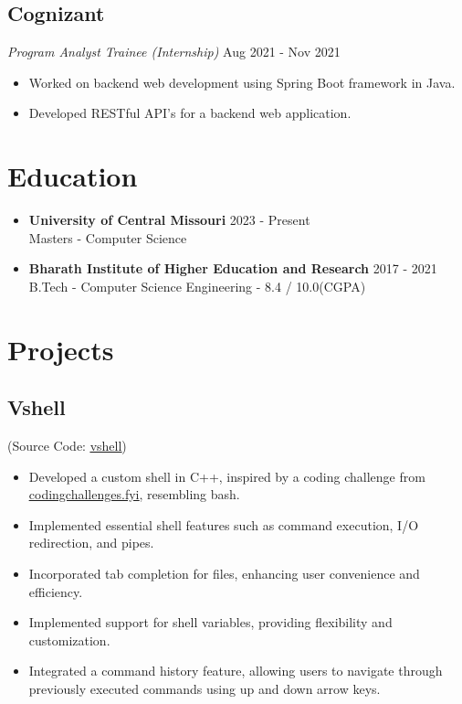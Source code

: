 \documentclass[10pt,a5paper]{article}
\begin{document}
\subsection{Cognizant}
\hspace*{0.25em}\textit{Program Analyst Trainee (Internship)}
\hfill Aug 2021 - Nov 2021
\begin{itemize}[leftmargin=6mm]
	\setlength\itemsep{0em}
	\item{Worked on backend web development using Spring Boot framework in Java.}
	\item{Developed RESTful API's for a backend web application.}
\end{itemize}

\section{Education}
\begin{itemize}[leftmargin=3mm]
	\setlength\itemsep{0em}
\item{
	\textbf{University of Central Missouri}
	\hfill 2023 {-} Present \\
	Masters {-} Computer Science
}
\item {
	\textbf{Bharath Institute of Higher Education and Research}
	\hfill 2017 {-} 2021 \\
	B.Tech {-} Computer Science Engineering {-} 8.4 / 10.0(CGPA)
}
\end{itemize}

\section{Projects}
\subsection{Vshell}
\hfill (Source Code: \href{https://github.com/v1n0dh/vshell}{\underline {vshell}})
\begin{itemize}[leftmargin=6mm]
	\setlength\itemsep{0em}
	\item{Developed a custom shell in C++, inspired by a coding challenge from \href{https://codingchallenges.fyi/challenges/challenge-shell}{\underline {codingchallenges.fyi}}, resembling bash.}
	\item{Implemented essential shell features such as command execution, I/O redirection, and pipes.
}
	\item{Incorporated tab completion for files, enhancing user convenience and efficiency.}
	\item{Implemented support for shell variables, providing flexibility and customization.}
	\item{Integrated a command history feature, allowing users to navigate through previously executed commands using up and down arrow keys.}
\end{itemize}
\vspace*{-0.5em}
\end{document}
